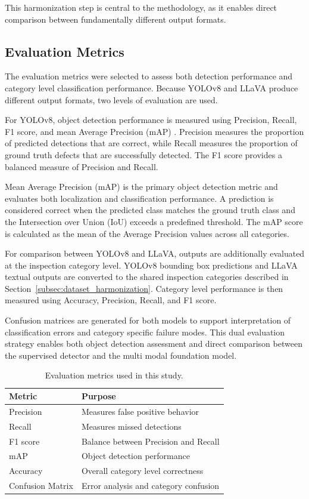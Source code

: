 This harmonization step is central to the methodology, as it enables direct comparison between fundamentally different output formats.

\subsection{Evaluation Metrics}
\label{subsec:evaluation_metrics}

The evaluation metrics were selected to assess both detection performance and category level classification performance. Because YOLOv8 and LLaVA produce different output formats, two levels of evaluation are used.

For YOLOv8, object detection performance is measured using Precision, Recall, F1 score, and mean Average Precision (mAP) \cite{redmon_you_2016}. Precision measures the proportion of predicted detections that are correct, while Recall measures the proportion of ground truth defects that are successfully detected. The F1 score provides a balanced measure of Precision and Recall.

Mean Average Precision (mAP) is the primary object detection metric and evaluates both localization and classification performance. A prediction is considered correct when the predicted class matches the ground truth class and the Intersection over Union (IoU) exceeds a predefined threshold. The mAP score is calculated as the mean of the Average Precision values across all categories.

For comparison between YOLOv8 and LLaVA, outputs are additionally evaluated at the inspection category level. YOLOv8 bounding box predictions and LLaVA textual outputs are converted to the shared inspection categories described in Section~\ref{subsec:dataset_harmonization}. Category level performance is then measured using Accuracy, Precision, Recall, and F1 score.

Confusion matrices are generated for both models to support interpretation of classification errors and category specific failure modes. This dual evaluation strategy enables both object detection assessment and direct comparison between the supervised detector and the multi modal foundation model.

\begin{table}[h]
\caption{Evaluation metrics used in this study.}
\label{tab:metrics}
\centering
\footnotesize
\begin{tabularx}{\columnwidth}{l X}
\toprule
Metric & Purpose \\
\midrule
Precision & Measures false positive behavior \\
Recall & Measures missed detections \\
F1 score & Balance between Precision and Recall \\
mAP & Object detection performance \\
Accuracy & Overall category level correctness \\
Confusion Matrix & Error analysis and category confusion \\
\bottomrule
\end{tabularx}
\end{table}


